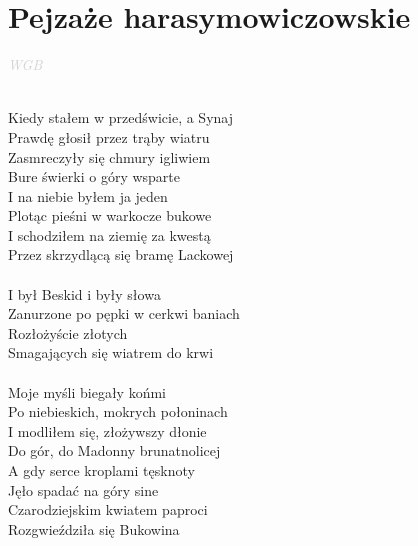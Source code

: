 \documentclass[a5paper, 10pt]{book}
\begin{document}
\section{Pejzaże harasymowiczowskie}\textcolor{lightgray}{\textit{WGB}}\\~\\
\begin{minipage}[t]{0.8\textwidth}
  Kiedy stałem w przedświcie, a Synaj\\
  Prawdę głosił przez trąby wiatru\\
  Zasmreczyły się chmury igliwiem\\
  Bure świerki o góry wsparte\\
  I na niebie byłem ja jeden\\
  Plotąc pieśni w warkocze bukowe\\
  I schodziłem na ziemię za kwestą\\
  Przez skrzydlącą się bramę Lackowej\\
  \\
  \hspace*{5mm}I był Beskid i były słowa\\
  \hspace*{5mm}Zanurzone po pępki w cerkwi baniach\\
  \hspace*{5mm}Rozłożyście złotych\\
  \hspace*{5mm}Smagających się wiatrem do krwi\\
  \\
  Moje myśli biegały końmi\\
  Po niebieskich, mokrych połoninach\\
  I modliłem się, złożywszy dłonie\\
  Do gór, do Madonny brunatnolicej\\
  A gdy serce kroplami tęsknoty\\
  Jęło spadać na góry sine\\
  Czarodziejskim kwiatem paproci\\
  Rozgwieździła się Bukowina\\
\end{minipage}
\end{document}
